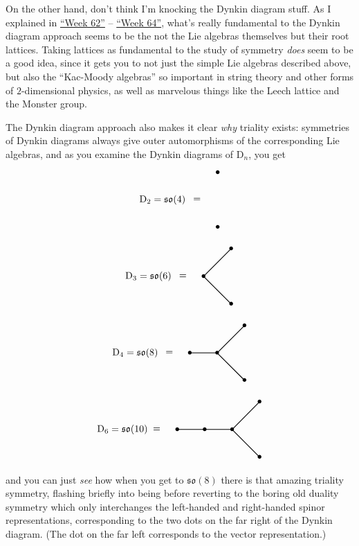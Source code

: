 \documentclass{article}
\begin{document}
On the other hand, don't think I'm knocking the Dynkin diagram stuff. As
I explained in \href{week62.html}{``Week 62''} --
\protect\hyperlink{week64}{``Week 64''}, what's really fundamental to
the Dynkin diagram approach seems to be the not the Lie algebras
themselves but their root lattices. Taking lattices as fundamental to
the study of symmetry \emph{does} seem to be a good idea, since it gets
you to not just the simple Lie algebras described above, but also the
``Kac-Moody algebras'' so important in string theory and other forms of
\(2\)-dimensional physics, as well as marvelous things like the Leech
lattice and the Monster group.

The Dynkin diagram approach also makes it clear \emph{why} triality
exists: symmetries of Dynkin diagrams always give outer automorphisms of
the corresponding Lie algebras, and as you examine the Dynkin diagrams
of \(\mathrm{D}_n\), you get \[
  \begin{tikzpicture}
    \node at (2,0) {$\mathrm{D}_2=\mathfrak{so}(4)$};
    \node at (3.25,0) {$=$};
    \draw[thick] (4,1) node {$\bullet$};
    \draw[thick] (4,-1) node {$\bullet$};
  \end{tikzpicture}
\] \[
  \begin{tikzpicture}
    \node at (1,0) {$\mathrm{D}_3=\mathfrak{so}(6)$};
    \node at (2.25,0) {$=$};
    \draw[thick] (3,0) node {$\bullet$};
    \draw[thick] (3,0) to (4,1) node {$\bullet$};
    \draw[thick] (3,0) to (4,-1) node {$\bullet$};
  \end{tikzpicture}
\] \[
  \begin{tikzpicture}
    \node at (0,0) {$\mathrm{D}_4=\mathfrak{so}(8)$};
    \node at (1.25,0) {$=$};
    \draw[thick] (2,0) node{$\bullet$} to (3,0) node {$\bullet$};
    \draw[thick] (3,0) to (4,1) node {$\bullet$};
    \draw[thick] (3,0) to (4,-1) node {$\bullet$};
  \end{tikzpicture}
\] \[
  \begin{tikzpicture}
    \node at (-1,0) {$\mathrm{D}_6=\mathfrak{so}(10)$};
    \node at (0.25,0) {$=$};
    \draw[thick] (1,0) node{$\bullet$} to (2,0) node{$\bullet$} to (3,0) node {$\bullet$};
    \draw[thick] (3,0) to (4,1) node {$\bullet$};
    \draw[thick] (3,0) to (4,-1) node {$\bullet$};
  \end{tikzpicture}
\] and you can just \emph{see} how when you get to \(\mathfrak{so}(8)\)
there is that amazing triality symmetry, flashing briefly into being
before reverting to the boring old duality symmetry which only
interchanges the left-handed and right-handed spinor representations,
corresponding to the two dots on the far right of the Dynkin diagram.
(The dot on the far left corresponds to the vector representation.)
\end{document}
